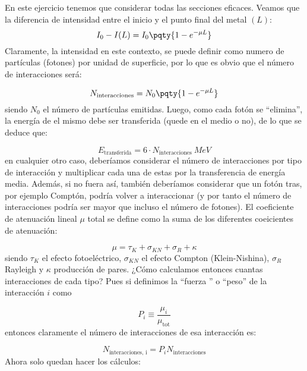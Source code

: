 En este ejercicio tenemos que considerar todas las secciones eficaces. Veamos que la diferencia de intensidad entre el inicio y el punto final del metal $(L)$: 
\begin{equation}
   I_0 - I(L) = I_0 \pqty{1-e^{-\mu L}} 
\end{equation}
Claramente, la intensidad en este contexto, se puede definir como numero de partículas (fotones) por unidad de superficie, por lo que es obvio que el número de interacciones será: 

\begin{equation}
    N_{\text{interacciones}}= N_0 \pqty{1-e^{-\mu L}} 
\end{equation}
siendo $N_0$ el número de partículas emitidas. Luego, como cada fotón se ``elimina'', la energía de el mismo debe ser transferida (quede en el medio o no), de lo que se deduce que: 

\begin{equation}
    E_{\text{transferida}} = 6 \cdot N_{\text{interacciones}}  \ \unit{MeV}
\end{equation}
en cualquier otro caso, deberíamos considerar el número de interacciones por tipo de interacción y multiplicar cada una de estas por la transferencia de energía media. Además, si no fuera así, también deberíamos considerar que un fotón tras, por ejemplo Comptón, podría volver a interaccionar (y por tanto el número de interacciones podría ser mayor que incluso el número de fotones). El coeficiente de atenuación lineal $\mu$ total se define como la suma de los diferentes coeicientes de atenuación: 

\begin{equation}
    \mu = \tau_K + \sigma_{KN} + \sigma_R + \kappa 
\end{equation}
siendo $\tau_K$ el efecto fotoeléctrico, $\sigma_{KN}$ el efecto Compton (Klein-Nishina), $\sigma_R$ Rayleigh y $\kappa$ producción de pares. ¿Cómo calculamos entonces cuantas interacciones de cada tipo? Pues si definimos la ``fuerza '' o ``peso'' de la interacción $i$ como 

\begin{equation}
    P_i \equiv \frac{\mu_i}{\mu_{\text{tot}}}
\end{equation}
entonces claramente el número de interacciones de esa interacción es: 

\begin{equation}
    N_{\text{interacciones, i}} =  P_i N_{\text{interacciones}}
\end{equation}
Ahora solo quedan hacer los cálculos: 

